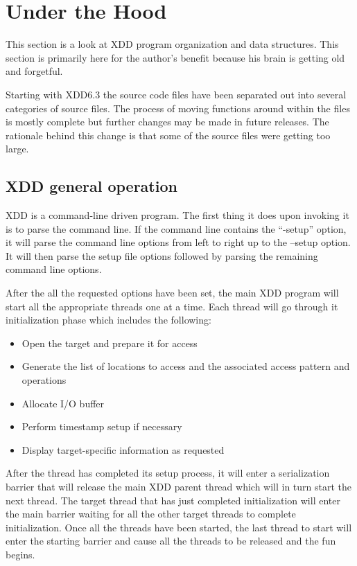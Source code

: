 \newpage
\section{\texorpdfstring{\hfill\break
Under the Hood}{ Under the Hood}}\label{under-the-hood}

This section is a look at XDD program organization and data structures. This section is primarily here for the author's benefit because his brain is getting old and forgetful.

Starting with XDD6.3 the source code files have been separated out into several categories of source files. The process of moving functions around within the files is mostly complete but further changes may be made in future releases. The rationale behind this change is that some of the source files were getting too large.

\subsection{XDD general operation}\label{xdd-general-operation}

XDD is a command-line driven program. The first thing it does upon invoking it is to parse the command line. If the command line contains the ``-setup'' option, it will parse the command line options from left to right up to the --setup option. It will then parse the setup file options followed by parsing the remaining command line options.

After the all the requested options have been set, the main XDD program will start all the appropriate threads one at a time. Each thread will go through it initialization phase which includes the following:

\begin{itemize}
\item
  Open the target and prepare it for access
\item
  Generate the list of locations to access and the associated access pattern and operations
\item
  Allocate I/O buffer
\item
  Perform timestamp setup if necessary
\item
  Display target-specific information as requested
\end{itemize}

After the thread has completed its setup process, it will enter a serialization barrier that will release the main XDD parent thread which will in turn start the next thread. The target thread that has just completed initialization will enter the main barrier waiting for all the other target threads to complete initialization. Once all the threads have been started, the last thread to start will enter the starting barrier and cause all the threads to be released and the fun begins.

